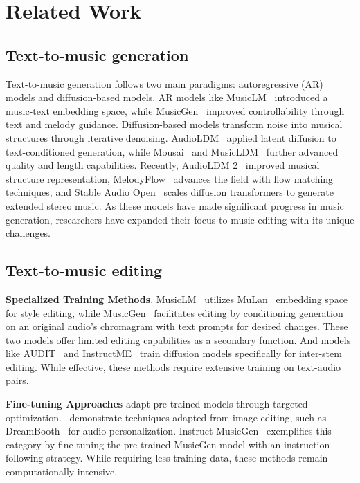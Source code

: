\section{Related Work}

\subsection{Text-to-music generation}
Text-to-music generation follows two main paradigms: autoregressive (AR) models and diffusion-based models. AR models like MusicLM~\cite{agostinelli2023musiclm} introduced a music-text embedding space, while MusicGen~\cite{musicgen} improved controllability through text and melody guidance. Diffusion-based models transform noise into musical structures through iterative denoising. AudioLDM~\cite{audioldm} applied latent diffusion to text-conditioned generation, while Mousai~\cite{mousai} and MusicLDM~\cite{chen2024musicldm} further advanced quality and length capabilities. Recently, AudioLDM 2~\cite{audioldm2} improved musical structure representation, MelodyFlow~\cite{melodyflow} advances the field with flow matching techniques, and Stable Audio Open~\cite{evans2025stableaudioopen} scales diffusion transformers to generate extended stereo music. As these models have made significant progress in music generation, researchers have expanded their focus to music editing with its unique challenges.

\subsection{Text-to-music editing}

\textbf{Specialized Training Methods}. MusicLM~\cite{agostinelli2023musiclm} utilizes MuLan~\cite{huang2022mulan} embedding space for style editing, while MusicGen~\cite{musicgen} facilitates editing by conditioning generation on an original audio's chromagram with text prompts for desired changes. These two models offer limited editing capabilities as a secondary function. And models like AUDIT~\cite{wang2023audit} and InstructME~\cite{han2023instructme} train diffusion models specifically for inter-stem editing. While effective, these methods require extensive training on text-audio pairs.

\textbf{Fine-tuning Approaches} adapt pre-trained models through targeted optimization.~\citet{plitsis2024investigating} demonstrate techniques adapted from image editing, such as DreamBooth~\cite{ruiz2023dreambooth} for audio personalization. Instruct-MusicGen~\cite{zhang2024instructmusicgen} exemplifies this category by fine-tuning the pre-trained MusicGen model with an instruction-following strategy. While requiring less training data, these methods remain computationally intensive. 

